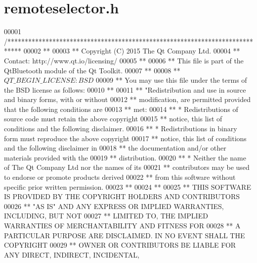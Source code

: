 \hypertarget{remoteselector_8h_source}{}\section{remoteselector.\+h}
\label{remoteselector_8h_source}

\begin{DoxyCode}
00001 \textcolor{comment}{/****************************************************************************}
00002 \textcolor{comment}{**}
00003 \textcolor{comment}{** Copyright (C) 2015 The Qt Company Ltd.}
00004 \textcolor{comment}{** Contact: http://www.qt.io/licensing/}
00005 \textcolor{comment}{**}
00006 \textcolor{comment}{** This file is part of the QtBluetooth module of the Qt Toolkit.}
00007 \textcolor{comment}{**}
00008 \textcolor{comment}{** $QT\_BEGIN\_LICENSE:BSD$}
00009 \textcolor{comment}{** You may use this file under the terms of the BSD license as follows:}
00010 \textcolor{comment}{**}
00011 \textcolor{comment}{** "Redistribution and use in source and binary forms, with or without}
00012 \textcolor{comment}{** modification, are permitted provided that the following conditions are}
00013 \textcolor{comment}{** met:}
00014 \textcolor{comment}{**   * Redistributions of source code must retain the above copyright}
00015 \textcolor{comment}{**     notice, this list of conditions and the following disclaimer.}
00016 \textcolor{comment}{**   * Redistributions in binary form must reproduce the above copyright}
00017 \textcolor{comment}{**     notice, this list of conditions and the following disclaimer in}
00018 \textcolor{comment}{**     the documentation and/or other materials provided with the}
00019 \textcolor{comment}{**     distribution.}
00020 \textcolor{comment}{**   * Neither the name of The Qt Company Ltd nor the names of its}
00021 \textcolor{comment}{**     contributors may be used to endorse or promote products derived}
00022 \textcolor{comment}{**     from this software without specific prior written permission.}
00023 \textcolor{comment}{**}
00024 \textcolor{comment}{**}
00025 \textcolor{comment}{** THIS SOFTWARE IS PROVIDED BY THE COPYRIGHT HOLDERS AND CONTRIBUTORS}
00026 \textcolor{comment}{** "AS IS" AND ANY EXPRESS OR IMPLIED WARRANTIES, INCLUDING, BUT NOT}
00027 \textcolor{comment}{** LIMITED TO, THE IMPLIED WARRANTIES OF MERCHANTABILITY AND FITNESS FOR}
00028 \textcolor{comment}{** A PARTICULAR PURPOSE ARE DISCLAIMED. IN NO EVENT SHALL THE COPYRIGHT}
00029 \textcolor{comment}{** OWNER OR CONTRIBUTORS BE LIABLE FOR ANY DIRECT, INDIRECT, INCIDENTAL,}

\end{DoxyCode}
